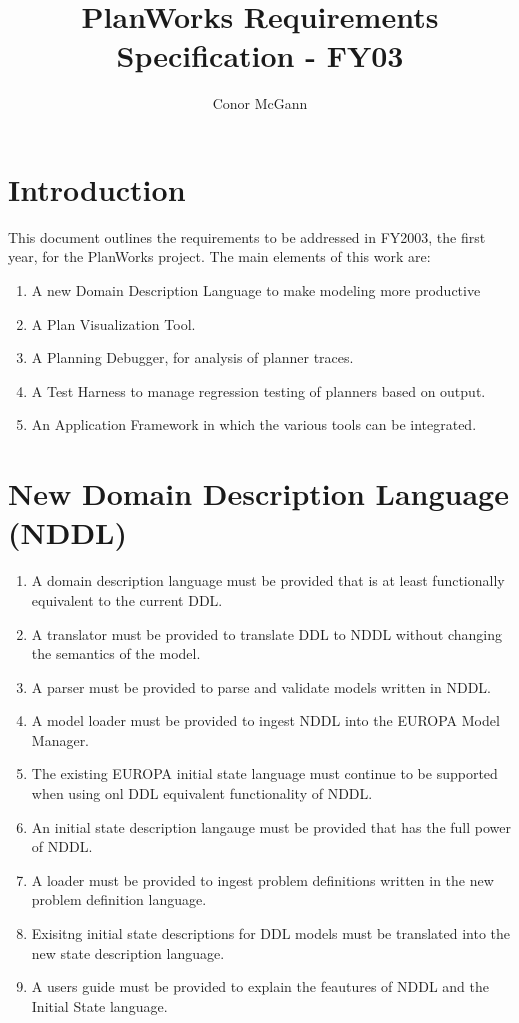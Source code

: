 \documentclass[twoside, 11pt]{article}
\author{Conor McGann}
\title{PlanWorks Requirements Specification - FY03}
\begin{document}
\maketitle

\section{Introduction}
This document outlines the requirements to be addressed in FY2003, the first year, for the PlanWorks project. The main elements of this work are:
\begin{enumerate}
\item A new Domain Description Language to make modeling more productive
\item A Plan Visualization Tool.
\item A Planning Debugger, for analysis of planner traces.
\item A Test Harness to manage regression testing of planners based on output.
\item An Application Framework in which the various tools can be integrated.
\end{enumerate}

\section{New Domain Description Language (NDDL)}
\begin{enumerate}
\item A domain description language must be provided that is at least functionally equivalent to the current DDL. 
\item A translator must be provided to translate DDL to NDDL without changing the semantics of the model.
\item A parser must be provided to parse and validate models written in NDDL.
\item A model loader must be provided to ingest NDDL into the EUROPA Model Manager.
\item The existing EUROPA initial state language must continue to be supported when using onl DDL equivalent functionality of NDDL.
\item An initial state description langauge must be provided that has the full power of NDDL.
\item A loader must be provided to ingest problem definitions written in the new problem definition language.
\item Exisitng initial state descriptions for DDL models must be translated into the new state description language.
\item A users guide must be provided to explain the feautures of NDDL and the Initial State language. 
\end{enumerate}
\end{document}

